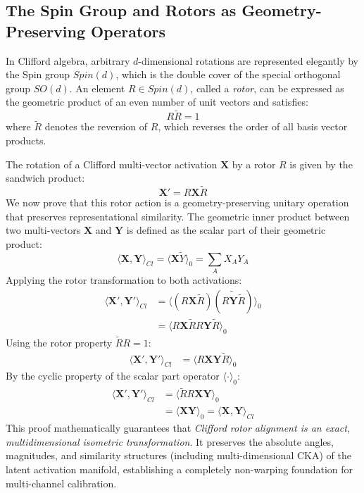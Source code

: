 \documentclass{article}
\begin{document}
\subsection{The Spin Group and Rotors as Geometry-Preserving Operators}
In Clifford algebra, arbitrary $d$-dimensional rotations are represented elegantly by the Spin group $Spin(d)$, which is the double cover of the special orthogonal group $SO(d)$. An element $R \in Spin(d)$, called a \textit{rotor}, can be expressed as the geometric product of an even number of unit vectors and satisfies:
\begin{equation}
    R \widetilde{R} = 1
\end{equation}
where $\widetilde{R}$ denotes the reversion of $R$, which reverses the order of all basis vector products.

The rotation of a Clifford multi-vector activation $\mathbf{X}$ by a rotor $R$ is given by the sandwich product:
\begin{equation}
    \mathbf{X}' = R \mathbf{X} \widetilde{R}
\end{equation}
We now prove that this rotor action is a geometry-preserving unitary operation that preserves representational similarity. The geometric inner product between two multi-vectors $\mathbf{X}$ and $\mathbf{Y}$ is defined as the scalar part of their geometric product:
\begin{equation}
    \langle \mathbf{X}, \mathbf{Y} \rangle_{Cl} = \langle \mathbf{X} \widetilde{Y} \rangle_0 = \sum_{A} X_A Y_A
\end{equation}
Applying the rotor transformation to both activations:
\begin{align}
    \langle \mathbf{X}', \mathbf{Y}' \rangle_{Cl} &= \langle \left( R \mathbf{X} \widetilde{R} \right) \left( \widetilde{R \mathbf{Y} \widetilde{R}} \right) \rangle_0 \\
    &= \langle R \mathbf{X} \widetilde{R} R \mathbf{Y} \widetilde{R} \rangle_0
\end{align}
Using the rotor property $\widetilde{R} R = 1$:
\begin{align}
    \langle \mathbf{X}', \mathbf{Y}' \rangle_{Cl} &= \langle R \mathbf{X} \mathbf{Y} \widetilde{R} \rangle_0
\end{align}
By the cyclic property of the scalar part operator $\langle \cdot \rangle_0$:
\begin{align}
    \langle \mathbf{X}', \mathbf{Y}' \rangle_{Cl} &= \langle \widetilde{R} R \mathbf{X} \mathbf{Y} \rangle_0 \\
    &= \langle \mathbf{X} \mathbf{Y} \rangle_0 = \langle \mathbf{X}, \mathbf{Y} \rangle_{Cl}
\end{align}
This proof mathematically guarantees that \textit{Clifford rotor alignment is an exact, multidimensional isometric transformation}. It preserves the absolute angles, magnitudes, and similarity structures (including multi-dimensional CKA) of the latent activation manifold, establishing a completely non-warping foundation for multi-channel calibration.
\end{document}

